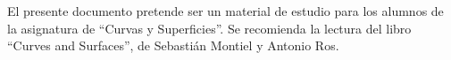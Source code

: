\noindent
El presente documento pretende ser un material de estudio para los alumnos de la asignatura de ``Curvas y Superficies''. Se recomienda la lectura del libro ``Curves and Surfaces'', de Sebastián Montiel y Antonio Ros.

% 
% 
% 
% 
%
%
%
% 

